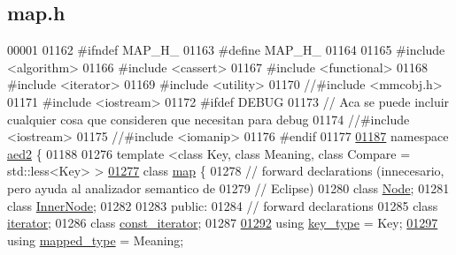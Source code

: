 \hypertarget{map_8h_source}{}\subsection{map.\+h}

\begin{DoxyCode}
00001 
01162 \textcolor{preprocessor}{#ifndef MAP\_H\_}
01163 \textcolor{preprocessor}{#define MAP\_H\_}
01164 
01165 \textcolor{preprocessor}{#include <algorithm>}
01166 \textcolor{preprocessor}{#include <cassert>}
01167 \textcolor{preprocessor}{#include <functional>}
01168 \textcolor{preprocessor}{#include <iterator>}
01169 \textcolor{preprocessor}{#include <utility>}
01170 \textcolor{comment}{//#include <mmcobj.h>}
01171 \textcolor{preprocessor}{#include <iostream>}
01172 \textcolor{preprocessor}{#ifdef DEBUG}
01173 \textcolor{comment}{// Aca se puede incluir cualquier cosa que consideren que necesitan para debug}
01174 \textcolor{comment}{//#include <iostream>}
01175 \textcolor{comment}{//#include <iomanip>}
01176 \textcolor{preprocessor}{#endif}
01177 
\hypertarget{map_8h_source.tex_l01187}{}\hyperlink{namespaceaed2}{01187} \textcolor{keyword}{namespace }\hyperlink{namespaceaed2}{aed2} \{
01188 
01276     \textcolor{keyword}{template} <\textcolor{keyword}{class} Key, \textcolor{keyword}{class} Meaning, \textcolor{keyword}{class} Compare = std::less<Key> >
\hypertarget{map_8h_source.tex_l01277}{}\hyperlink{classaed2_1_1map}{01277}     \textcolor{keyword}{class }\hyperlink{classaed2_1_1map}{map} \{
01278         \textcolor{comment}{// forward declarations (innecesario, pero ayuda al analizador semantico de}
01279         \textcolor{comment}{// Eclipse)}
01280         \textcolor{keyword}{class }\hyperlink{structaed2_1_1map_1_1Node}{Node};
01281         \textcolor{keyword}{class }\hyperlink{structaed2_1_1map_1_1InnerNode}{InnerNode};
01282 
01283     \textcolor{keyword}{public}:
01284         \textcolor{comment}{// forward declarations}
01285         \textcolor{keyword}{class }\hyperlink{classaed2_1_1map_1_1iterator}{iterator};
01286         \textcolor{keyword}{class }\hyperlink{classaed2_1_1map_1_1const__iterator}{const\_iterator};
01287 
\hypertarget{map_8h_source.tex_l01292}{}\hyperlink{classaed2_1_1map_a4273e8812e7105a618df58a2c8b72b7d_a4273e8812e7105a618df58a2c8b72b7d}{01292}         \textcolor{keyword}{using} \hyperlink{classaed2_1_1map_a4273e8812e7105a618df58a2c8b72b7d_a4273e8812e7105a618df58a2c8b72b7d}{key\_type} = Key;
\hypertarget{map_8h_source.tex_l01297}{}\hyperlink{classaed2_1_1map_aa3e34bf624f3009884a71b18f4ddae40_aa3e34bf624f3009884a71b18f4ddae40}{01297}         \textcolor{keyword}{using} \hyperlink{classaed2_1_1map_aa3e34bf624f3009884a71b18f4ddae40_aa3e34bf624f3009884a71b18f4ddae40}{mapped\_type} = Meaning;

\end{DoxyCode}
